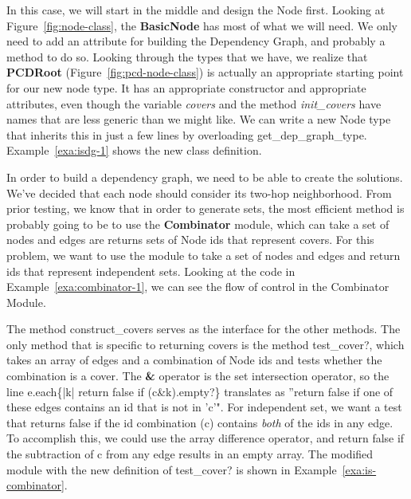 In this case, we will start in the middle and design the Node first. Looking at Figure~\ref{fig:node-class}, the {\bfseries BasicNode} has most of what we will need. We only need to add an attribute for building the Dependency Graph, and probably a method to do so. Looking through the types that we have, we realize that {\bfseries PCDRoot} (Figure~\ref{fig:pcd-node-class}) is actually an appropriate starting point for our new node type. It has an appropriate constructor and appropriate attributes, even though the variable {\em covers} and the method {\em init\_covers} have names that are less generic than we might like. We can write a new Node type that inherits this in just a few lines by overloading {\ttfamily get\_dep\_graph\_type}. Example~\ref{exa:isdg-1} shows the new class definition.



In order to build a dependency graph, we need to be able to create the solutions. We've decided that each node should consider its two-hop neighborhood. From prior testing, we know that in order to generate sets, the most efficient method is probably going to be to use the {\bfseries Combinator} module, which can take a set of nodes and edges are returns sets of Node ids that represent covers. For this problem, we want to use the module to take a set of nodes and edges and return ids that represent independent sets. Looking at the code in Example~\ref{exa:combinator-1}, we can see the flow of control in the Combinator Module. 



The method {\ttfamily construct\_covers} serves as the interface for the other methods. The only method that is specific to returning covers is the method {\ttfamily test\_cover?}, which takes an array of edges and a combination of Node ids and tests whether the combination is a cover. The {\bfseries \&} operator is the set intersection operator, so the line {\ttfamily e.each\{|k| return false if (c\&k).empty?\}} translates as ''return false if one of these edges contains an id that is not in 'c'". For independent set, we want a test that returns false if the id combination (c) contains {\em both} of the ids in any edge. To accomplish this, we could use the array difference operator, and return false if the subtraction of c from any edge results in an empty array. The modified module with the new definition of {\ttfamily test\_cover?} is shown in Example~\ref{exa:is-combinator}.  



